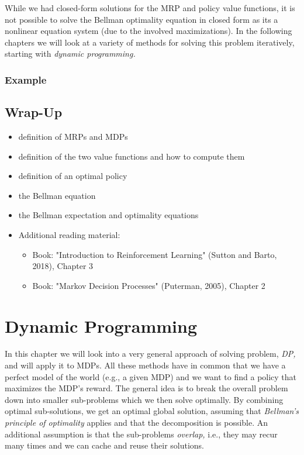 				While we had closed-form solutions for the \ac{MRP} and policy value functions, it is not possible to solve the Bellman optimality equation in closed form as its a nonlinear equation system (due to the involved maximizations). In the following chapters we will look at a variety of methods for solving this problem iteratively, starting with \emph{dynamic programming.}

		\subsection{Example}

	\section{Wrap-Up}
		\begin{itemize}
			\item definition of \aclp{MRP} and \aclp{MDP}
			\item definition of the two value functions and how to compute them
			\item definition of an optimal policy
			\item the Bellman equation
			\item the Bellman expectation and optimality equations
			\item Additional reading material:
				\begin{itemize}
					\item Book: "Introduction to Reinforcement Learning" (Sutton and Barto, 2018), Chapter 3  %
					\item Book: "Markov Decision Processes" (Puterman, 2005), Chapter 2
				\end{itemize}
		\end{itemize}

\chapter{Dynamic Programming}
	\label{c:dp}

	In this chapter we will look into a very general approach of solving problem, \emph{\ac{DP},} and will apply it to \acp{MDP}. All these methods have in common that we have a perfect model of the world (e.g., a given \ac{MDP}) and we want to find a policy that maximizes the \ac{MDP}'s reward. The general idea is to break the overall problem down into smaller sub-problems which we then solve optimally. By combining optimal sub-solutions, we get an optimal global solution, assuming that \emph{Bellman's principle of optimality} applies and that the decomposition is possible. An additional assumption is that the sub-problems \emph{overlap,} i.e., they may recur many times and we can cache and reuse their solutions.

